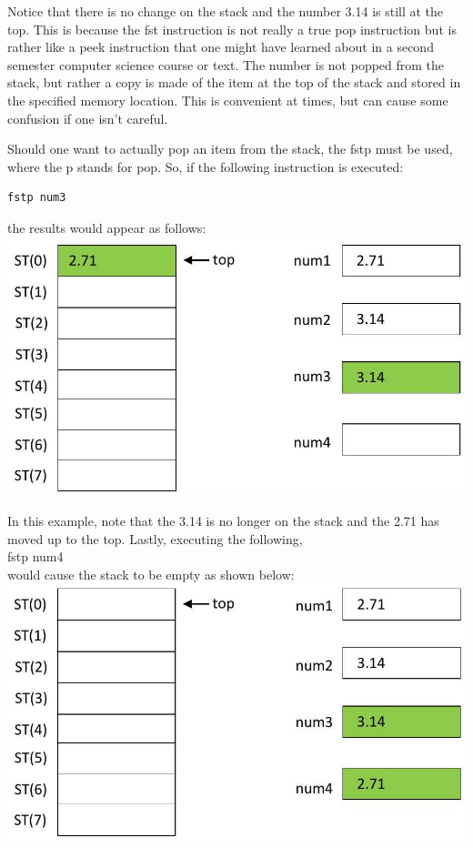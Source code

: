 \documentclass[10pt]{article}
\begin{document}
Notice that there is no change on the stack and the number 3.14 is still at the top. This is because the fst instruction is not really a true pop instruction but is rather like a peek instruction that one might have learned about in a second semester computer science course or text. The number is not popped from the stack, but rather a copy is made of the item at the top of the stack and stored in the specified memory location. This is convenient at times, but can cause some confusion if one isn't careful.

Should one want to actually pop an item from the stack, the fstp must be used, where the p stands for pop. So, if the following instruction is executed:

\begin{verbatim}
fstp num3
\end{verbatim}

the results would appear as follows:\\
\includegraphics[max width=\textwidth, center]{2025_03_24_ebe50cc223a6fbc49eecg-224(1)}

In this example, note that the 3.14 is no longer on the stack and the 2.71 has moved up to the top. Lastly, executing the following,\\
fstp num4\\
would cause the stack to be empty as shown below:\\
\includegraphics[max width=\textwidth, center]{2025_03_24_ebe50cc223a6fbc49eecg-224}
\end{document}
